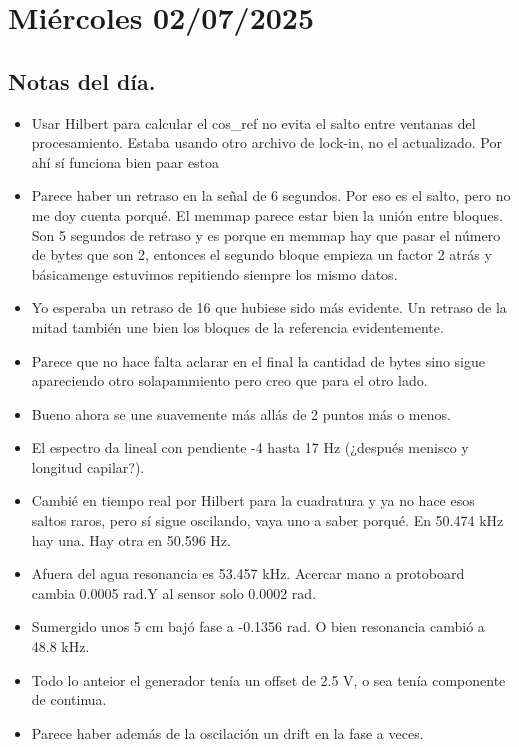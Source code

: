 \section{Miércoles 02/07/2025}


\subsection*{Notas del día.}
\begin{itemize}
	\item Usar Hilbert para calcular el cos\_ref no evita el salto entre ventanas del procesamiento. Estaba usando otro archivo de lock-in, no el actualizado. Por ahí sí funciona bien paar estoa 
	\item Parece haber un retraso en la señal de 6 segundos. Por eso es el salto, pero no me doy cuenta porqué. El memmap parece estar bien la unión entre bloques. Son 5 segundos de retraso y es porque en memmap hay que pasar el número de bytes que son 2, entonces el segundo bloque empieza un factor 2 atrás y básicamenge estuvimos repitiendo siempre los mismo datos. 
	\item Yo esperaba un retraso de 16 que hubiese sido más evidente. Un retraso de la mitad también une bien los bloques de la referencia evidentemente. 
	\item Parece que no hace falta aclarar en el final la cantidad de bytes sino sigue apareciendo otro solapammiento pero creo que para el otro lado. 
	\item Bueno ahora se une suavemente más allás de 2 puntos más o menos.
	
	\item El espectro da lineal con pendiente -4 hasta 17 Hz (¿después menisco y longitud capilar?). 
	
	\item Cambié en tiempo real por Hilbert para la cuadratura y ya no hace esos saltos raros, pero sí sigue oscilando, vaya uno a saber porqué. En 50.474 kHz hay una. Hay otra en 50.596 Hz.
	\item Afuera del agua resonancia es 53.457 kHz. Acercar mano a protoboard cambia 0.0005 rad.Y al sensor solo 0.0002 rad. 
	\item Sumergido unos 5 cm bajó fase a -0.1356 rad. O bien resonancia cambió a 48.8 kHz.
	\item Todo lo anteior el generador tenía un offset de 2.5 V, o sea tenía componente de continua. 
	\item Parece haber además de la oscilación un drift en la fase a veces. 
	

\end{itemize}
